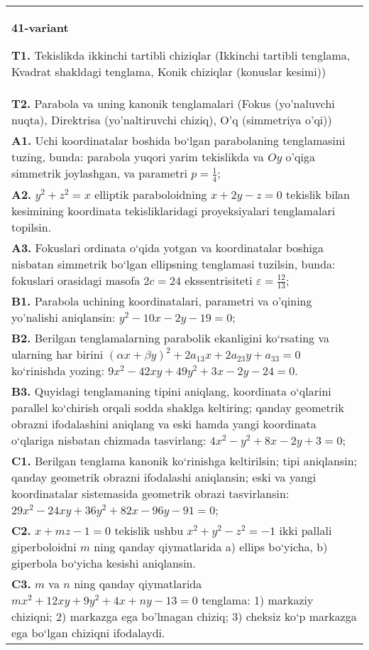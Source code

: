 \documentclass{article}
\begin{document}
\begin{tabular}{m{17cm}}
\textbf{41-variant}
\newline

\textbf{T1.} Tekislikda ikkinchi tartibli chiziqlar (Ikkinchi tartibli tenglama, Kvadrat shakldagi tenglama, Konik chiziqlar (konuslar kesimi)) \\
\textbf{T2.} Parabola va uning kanonik tenglamalari (Fokus (yo’naluvchi nuqta), Direktrisa (yo’naltiruvchi chiziq), O’q (simmetriya o’qi)) \\
\textbf{A1.} Uchi koordinatalar boshida bo‘lgan parabolaning tenglamasini tuzing, bunda: parabola yuqori yarim tekislikda va $Oy$ o'qiga simmetrik joylashgan, va parametri $p=\frac{1}{4}$; \\
\textbf{A2.} $y^2+z^2=x$ elliptik paraboloidning $x+2 y-z=0$ tekislik bilan kesimining koordinata tekisliklaridagi proyeksiyalari tenglamalari topilsin. \\
\textbf{A3.} Fokuslari ordinata o‘qida yotgan va koordinatalar boshiga nisbatan simmetrik bo‘lgan ellipsning tenglamasi tuzilsin, bunda: fokuslari orasidagi masofa $2 c=24$ ekssentrisiteti $\varepsilon=\frac{12}{13}$; \\
\textbf{B1.} Parabola uchining koordinatalari, parametri va o'qining yo'nalishi aniqlansin: $y^2-10 x-2 y-19=0$; \\
\textbf{B2.} Berilgan tenglamalarning parabolik ekanligini ko‘rsating va ularning har birini $(\alpha x+\beta y)^2+2 a_{13} x+2 a_{23} y+a_{33}=0$ ko‘rinishda yozing: $9 x^2-42 x y+49 y^2+3 x-2 y-24=0$. \\
\textbf{B3.} Quyidagi tenglamaning tipini aniqlang, koordinata o‘qlarini parallel ko‘chirish orqali sodda shaklga keltiring; qanday geometrik obrazni ifodalashini aniqlang va eski hamda yangi koordinata o‘qlariga nisbatan chizmada tasvirlang: $4 x^2-y^2+8 x-2 y+3=0$; \\
\textbf{C1.} Berilgan tenglama kanonik ko‘rinishga keltirilsin; tipi aniqlansin; qanday geometrik obrazni ifodalashi aniqlansin; eski va yangi koordinatalar sistemasida geometrik obrazi tasvirlansin: $29 x^2-24 x y+36 y^2+82 x-96 y-91=0$; \\
\textbf{C2.} $x+m z-1=0$ tekislik ushbu $x^2+y^2-z^2=-1$ ikki pallali giperboloidni $m$ ning qanday qiymatlarida a) ellips bo‘yicha, b) giperbola bo‘yicha kesishi aniqlansin. \\
\textbf{C3.} $m$ va $n$ ning qanday qiymatlarida $m x^2+12 x y+9 y^2+4 x+n y-13=0$ tenglama: 1) markaziy chiziqni; 2) markazga ega bo'lmagan chiziq; 3) cheksiz ko‘p markazga ega bo‘lgan chiziqni ifodalaydi. \\

\end{tabular}
\vspace{1cm}
\end{document}
